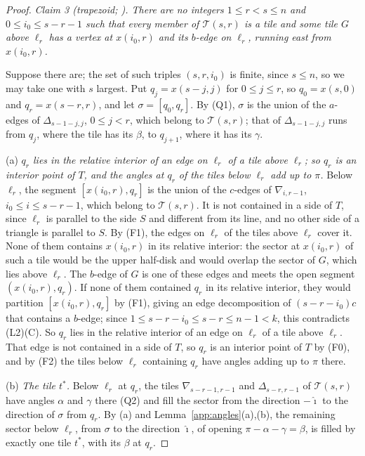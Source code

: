 \documentclass[11pt]{amsart}
\theoremstyle{remark}
\begin{document}
\begin{proof}
\emph{Claim 3 \textup{(}trapezoid; \cite[Lemma~32]{BR}\textup{)}. There are no integers $1\le r<s\le n$ and $0\le i_0\le s-r-1$ such that every member of $\mathcal{T}(s,r)$ is a tile and some tile $G$ above $\ell_r$ has a vertex at $x(i_0,r)$ and its $b$-edge on $\ell_r$, running east from $x(i_0,r)$.}

Suppose there are; the set of such triples $(s,r,i_0)$ is finite, since $s\le n$, so we may take one with $s$ largest. Put $q_j=x(s-j,j)$ for $0\le j\le r$, so $q_0=x(s,0)$ and $q_r=x(s-r,r)$, and let $\sigma=[q_0,q_r]$. By (Q1), $\sigma$ is the union of the $a$-edges of $\Delta_{s-1-j,j}$, $0\le j<r$, which belong to $\mathcal{T}(s,r)$; that of $\Delta_{s-1-j,j}$ runs from $q_j$, where the tile has its $\beta$, to $q_{j+1}$, where it has its $\gamma$.

(a) \emph{$q_r$ lies in the relative interior of an edge on $\ell_r$ of a tile above $\ell_r$; so $q_r$ is an interior point of $T$, and the angles at $q_r$ of the tiles below $\ell_r$ add up to $\pi$.} Below $\ell_r$, the segment $[x(i_0,r),q_r]$ is the union of the $c$-edges of $\nabla_{i,r-1}$, $i_0\le i\le s-r-1$, which belong to $\mathcal{T}(s,r)$. It is not contained in a side of $T$, since $\ell_r$ is parallel to the side $S$ and different from its line, and no other side of a triangle is parallel to $S$. By (F1), the edges on $\ell_r$ of the tiles above $\ell_r$ cover it. None of them contains $x(i_0,r)$ in its relative interior: the sector at $x(i_0,r)$ of such a tile would be the upper half-disk and would overlap the sector of $G$, which lies above $\ell_r$. The $b$-edge of $G$ is one of these edges and meets the open segment $(x(i_0,r),q_r)$. If none of them contained $q_r$ in its relative interior, they would partition $[x(i_0,r),q_r]$ by (F1), giving an edge decomposition of $(s-r-i_0)c$ that contains a $b$-edge; since $1\le s-r-i_0\le s-r\le n-1<k$, this contradicts (L2)(C). So $q_r$ lies in the relative interior of an edge on $\ell_r$ of a tile above $\ell_r$. That edge is not contained in a side of $T$, so $q_r$ is an interior point of $T$ by (F0), and by (F2) the tiles below $\ell_r$ containing $q_r$ have angles adding up to $\pi$ there.

(b) \emph{The tile $t^\ast$.} Below $\ell_r$ at $q_r$, the tiles $\nabla_{s-r-1,r-1}$ and $\Delta_{s-r,r-1}$ of $\mathcal{T}(s,r)$ have angles $\alpha$ and $\gamma$ there (Q2) and fill the sector from the direction $-\hat\imath$ to the direction of $\sigma$ from $q_r$. By (a) and Lemma~\ref{app:angles}(a),(b), the remaining sector below $\ell_r$, from $\sigma$ to the direction $\hat\imath$, of opening $\pi-\alpha-\gamma=\beta$, is filled by exactly one tile $t^\ast$, with its $\beta$ at $q_r$.


\end{proof}
\end{document}

